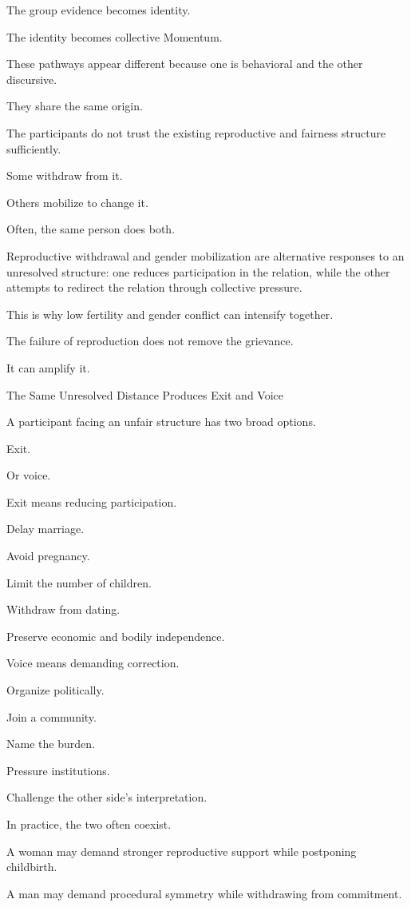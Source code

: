 The group evidence becomes identity.

The identity becomes collective Momentum.

These pathways appear different because one is behavioral and the other discursive.

They share the same origin.

The participants do not trust the existing reproductive and fairness structure sufficiently.

Some withdraw from it.

Others mobilize to change it.

Often, the same person does both.

Reproductive withdrawal and gender mobilization are alternative responses to an unresolved structure: one reduces participation in the relation, while the other attempts to redirect the relation through collective pressure.

This is why low fertility and gender conflict can intensify together.

The failure of reproduction does not remove the grievance.

It can amplify it.

The Same Unresolved Distance Produces Exit and Voice

A participant facing an unfair structure has two broad options.

Exit.

Or voice.

Exit means reducing participation.

Delay marriage.

Avoid pregnancy.

Limit the number of children.

Withdraw from dating.

Preserve economic and bodily independence.

Voice means demanding correction.

Organize politically.

Join a community.

Name the burden.

Pressure institutions.

Challenge the other side’s interpretation.

In practice, the two often coexist.

A woman may demand stronger reproductive support while postponing childbirth.

A man may demand procedural symmetry while withdrawing from commitment.

